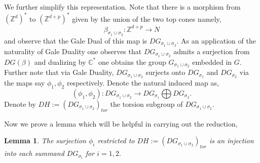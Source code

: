 \documentclass[10pt]{amsart}
\newtheorem{lem}[prop]{Lemma}
\numberwithin{equation}{subsection}
\begin{document}
We further simplify this representation. Note that there is a morphism from $({\mathbb{Z}^d})^{*}$ to $({\mathbb{Z}^{d+p}})^{*}$ given by the union of the two top cones namely,
$$\beta_{\sigma_1\cup\sigma_2}:\mathbb{Z}^{d+p} \to N $$and observe that the Gale Dual of this map is $DG_{\sigma_1\cup\sigma_2}.$ As an application of the naturality of Gale Duality one observes that $DG_{\sigma_1\cup\sigma_2}$ admits a surjection from $DG(\beta)$ and dualizing by $\mathbb{C^*}$ one obtains the group $G_{\sigma_1\cup\sigma_2}$ embedded in $G.$ Further note that via Gale Duality, $DG_{\sigma_1\cup\sigma_2}$ surjects onto $DG_{\sigma_1}$ and $DG_{\sigma_2}$ via the maps say $\phi_1,\phi_2$ respectively. Denote the natural induced map as,$$(\phi_1,\phi_2):DG_{\sigma_1\cup\sigma_2}\to DG_{\sigma_1}\bigoplus DG_{\sigma_2}.$$
Denote by $DH:=(DG_{\sigma_1\cup \sigma_2})_{tor}$ the torsion subgroup of $DG_{\sigma_1\cup \sigma_2}.$\par 
Now we prove a lemma which will be helpful in carrying out the reduction,
\begin{lem}\label{Cokernel}
The surjection $\phi_i$ restricted to $DH:=(DG_{\sigma_1\cup \sigma_2})_{tor}$ is an injection into each summand $DG_{\sigma_i}$ for $i=1,2.$   
\end{lem}
\end{document}
